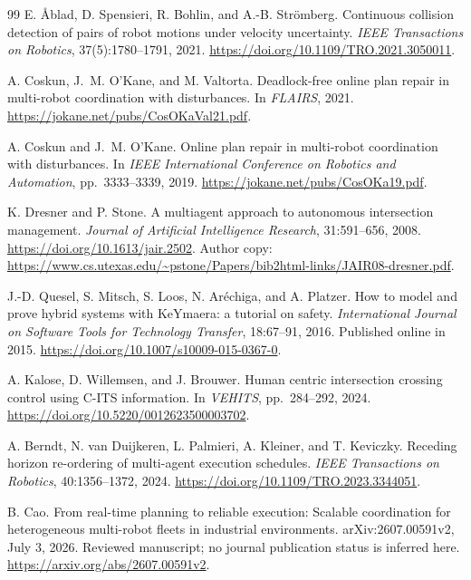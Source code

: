 \documentclass[11pt,a4paper]{article}
\theoremstyle{remark}
\begin{document}
{\begin{thebibliography}{99}
E. {\AA}blad, D. Spensieri, R. Bohlin, and A.-B. Str\"omberg.
\newblock Continuous collision detection of pairs of robot motions under velocity uncertainty.
\newblock \emph{IEEE Transactions on Robotics}, 37(5):1780--1791, 2021.
\newblock \url{https://doi.org/10.1109/TRO.2021.3050011}.

A. Coskun, J.~M. O'Kane, and M. Valtorta.
\newblock Deadlock-free online plan repair in multi-robot coordination with disturbances.
\newblock In \emph{FLAIRS}, 2021.
\newblock \url{https://jokane.net/pubs/CosOKaVal21.pdf}.

A. Coskun and J.~M. O'Kane.
\newblock Online plan repair in multi-robot coordination with disturbances.
\newblock In \emph{IEEE International Conference on Robotics and Automation},
pp.~3333--3339, 2019.
\newblock \url{https://jokane.net/pubs/CosOKa19.pdf}.

K. Dresner and P. Stone.
\newblock A multiagent approach to autonomous intersection management.
\newblock \emph{Journal of Artificial Intelligence Research}, 31:591--656, 2008.
\newblock \url{https://doi.org/10.1613/jair.2502}.
\newblock Author copy: \url{https://www.cs.utexas.edu/~pstone/Papers/bib2html-links/JAIR08-dresner.pdf}.

J.-D. Quesel, S. Mitsch, S. Loos, N. Ar\'echiga, and A. Platzer.
\newblock How to model and prove hybrid systems with KeYmaera: a tutorial on safety.
\newblock \emph{International Journal on Software Tools for Technology Transfer},
18:67--91, 2016. Published online in 2015.
\newblock \url{https://doi.org/10.1007/s10009-015-0367-0}.

A. Kalose, D. Willemsen, and J. Brouwer.
\newblock Human centric intersection crossing control using C-ITS information.
\newblock In \emph{VEHITS}, pp.~284--292, 2024.
\newblock \url{https://doi.org/10.5220/0012623500003702}.

A. Berndt, N. van Duijkeren, L. Palmieri, A. Kleiner, and T. Keviczky.
\newblock Receding horizon re-ordering of multi-agent execution schedules.
\newblock \emph{IEEE Transactions on Robotics}, 40:1356--1372, 2024.
\newblock \url{https://doi.org/10.1109/TRO.2023.3344051}.

B. Cao.
\newblock From real-time planning to reliable execution: Scalable coordination
for heterogeneous multi-robot fleets in industrial environments.
\newblock arXiv:2607.00591v2, July 3, 2026. Reviewed manuscript;
no journal publication status is inferred here.
\newblock \url{https://arxiv.org/abs/2607.00591v2}.


\end{thebibliography}}
\end{document}

